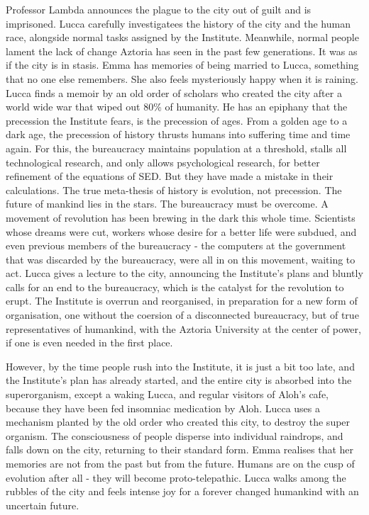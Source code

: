 \documentclass[11pt]{article}
\begin{document}
	Professor Lambda announces the plague to the city out of guilt and is imprisoned.	
	Lucca carefully investigatees the history of the city and the human race, alongside normal tasks assigned by the Institute. 
	Meanwhile, normal people lament the lack of change Aztoria has seen in the past few generations.
	It was as if the city is in stasis.
	Emma has memories of being married to Lucca, something that no one else remembers. 
	She also feels mysteriously happy when it is raining.
	Lucca finds a memoir by an old order of scholars who created the city after a world wide war that wiped out 80\% of humanity. 
	He has an epiphany that the precession the Institute fears, is the precession of ages. 
	From a golden age to a dark age, the precession of history thrusts humans into suffering time and time again.
	For this, the bureaucracy maintains population at a threshold, stalls all technological research, and only allows psychological research, for better refinement of the equations of SED.
	But they have made a mistake in their calculations. 
	The true meta-thesis of history is evolution, not precession. 
	The future of mankind lies in the stars.
	The bureaucracy must be overcome.
	A movement of revolution has been brewing in the dark this whole time.
	Scientists whose dreams were cut, workers whose desire for a better life were subdued, and even previous members of the bureaucracy - the computers at the government that was discarded by the bureaucracy, were all in on this movement, waiting to act.
	Lucca gives a lecture to the city, announcing the Institute's plans and bluntly calls for an end to the bureaucracy, which is the catalyst for the revolution to erupt. 
	The Institute is overrun and reorganised, in preparation for a new form of organisation, one without the coersion of a disconnected bureaucracy, but of true representatives of humankind, with the Aztoria University at the center of power, if one is even needed in the first place.
	
	However, by the time people rush into the Institute, it is just a bit too late, and the Institute's plan has already started, and the entire city is absorbed into the superorganism, except a waking Lucca, and regular visitors of Aloh's cafe, because they have been fed insomniac medication by Aloh.
	Lucca uses a mechanism planted by the old order who created this city, to destroy the super organism.
	The consciousness of people disperse into individual raindrops, and falls down on the city, returning to their standard form.
	Emma realises that her memories are not from the past but from the future.
	Humans are on the cusp of evolution after all - they will become proto-telepathic.
	Lucca walks among the rubbles of the city and feels intense joy for a forever changed humankind with an uncertain future.
\end{document}

